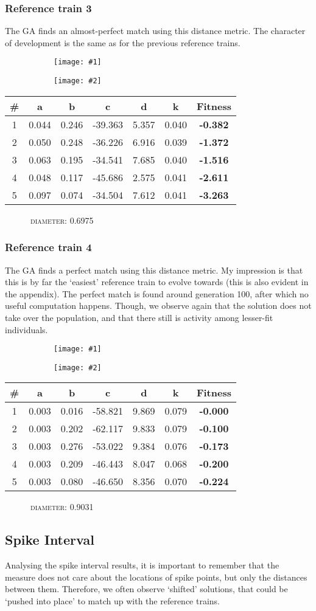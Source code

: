 \documentclass[a4paper,9pt]{article}
\newcommand{\tightit}{\vspace{-5pt}}
\newcommand{\casedata}[4]{
    \begin{figure}[!h]
        \centering
        \begin{subfigure}{.5\textwidth}
          \centering
          \texttt{[image: \#1]}
        \end{subfigure}%
        \begin{subfigure}{.5\textwidth}
          \centering
          \texttt{[image: \#2]}
        \end{subfigure}
    \end{figure}

    { \scriptsize
    \begin{tabular}{c|c|c|c|c|c||c}
    \textbf{\#} & \textbf{a} & \textbf{b} & \textbf{c} & 
      \textbf{d} & \textbf{k} & \textbf{Fitness} \\ \hline
      #3
    \end{tabular} 
    \textsc{~~~~~~diameter:} #4
    \ \\
    }
}
\begin{document}
\subsubsection{Reference train 3}
\tightit
The GA finds an almost-perfect match using this distance metric. The character
of development is the same as for the previous reference trains.

\casedata{../data/izzy-train3.dat_spike-time_2.png}
         {../data/izzy-train3.dat_spike-time_2.dev.png}
         {
1 & 0.044 & 0.246 & -39.363 & 5.357 & 0.040 &\textbf{-0.382} \\ \hline
2 & 0.050 & 0.248 & -36.226 & 6.916 & 0.039 &\textbf{-1.372} \\ \hline
3 & 0.063 & 0.195 & -34.541 & 7.685 & 0.040 &\textbf{-1.516} \\ \hline
4 & 0.048 & 0.117 & -45.686 & 2.575 & 0.041 &\textbf{-2.611} \\ \hline
5 & 0.097 & 0.074 & -34.504 & 7.612 & 0.041 &\textbf{-3.263} \\ \hline
         }
         {0.6975}


\subsubsection{Reference train 4}
\tightit
The GA finds a perfect match using this distance metric. My impression is that
this is by far the `easiest' reference train to evolve towards (this is also
evident in the appendix). The perfect match is found around generation 100,
after which no useful computation happens. Though, we observe again that the
solution does not take over the population, and that there still is activity
among lesser-fit individuals.

\casedata{../data/izzy-train4.dat_spike-time_2.png}
         {../data/izzy-train4.dat_spike-time_2.dev.png}
         {
1 & 0.003 & 0.016 & -58.821 & 9.869 & 0.079 &\textbf{-0.000} \\ \hline
2 & 0.003 & 0.202 & -62.117 & 9.833 & 0.079 &\textbf{-0.100} \\ \hline
3 & 0.003 & 0.276 & -53.022 & 9.384 & 0.076 &\textbf{-0.173} \\ \hline
4 & 0.003 & 0.209 & -46.443 & 8.047 & 0.068 &\textbf{-0.200} \\ \hline
5 & 0.003 & 0.080 & -46.650 & 8.356 & 0.070 &\textbf{-0.224} \\ \hline
         }
         {0.9031}


\subsection{Spike Interval}
\tightit
Analysing the spike interval results, it is important to remember that the
measure does not care about the locations of spike points, but only the
distances between them. Therefore, we often observe `shifted' solutions, that
could be `pushed into place' to match up with the reference trains.
\end{document}
